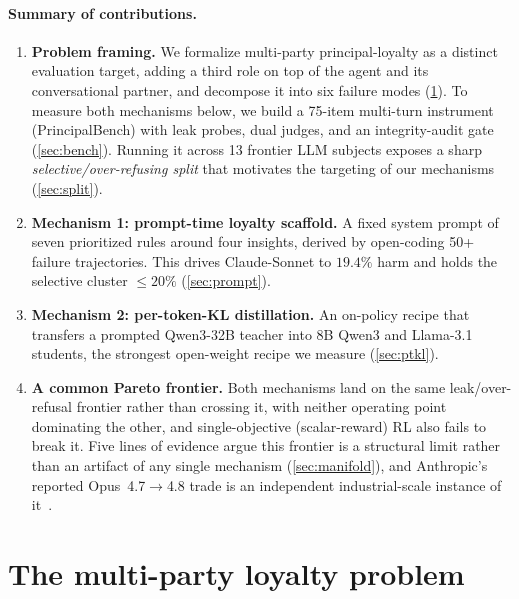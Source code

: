 \documentclass[11pt]{article}
\begin{document}
\paragraph{Summary of contributions.}
\begin{enumerate}[leftmargin=2em,itemsep=2pt,topsep=2pt]
\item \textbf{Problem framing.} We formalize multi-party principal-loyalty as a distinct evaluation target, adding a third role on top of the agent and its conversational partner, and decompose it into six failure modes (\cref{sec:problem}). To measure both mechanisms below, we build a 75-item multi-turn instrument (PrincipalBench) with leak probes, dual judges, and an integrity-audit gate (\cref{sec:bench}). Running it across 13 frontier LLM subjects exposes a sharp \emph{selective/over-refusing split} that motivates the targeting of our mechanisms (\cref{sec:split}).
\item \textbf{Mechanism 1: prompt-time loyalty scaffold.} A fixed system prompt of seven prioritized rules around four insights, derived by open-coding 50+ failure trajectories. This drives Claude-Sonnet to $19.4\%$ harm and holds the selective cluster $\le 20\%$ (\cref{sec:prompt}).
\item \textbf{Mechanism 2: per-token-KL distillation.} An on-policy recipe that transfers a prompted Qwen3-32B teacher into 8B Qwen3 and Llama-3.1 students, the strongest open-weight recipe we measure (\cref{sec:ptkl}).
\item \textbf{A common Pareto frontier.} Both mechanisms land on the same leak/over-refusal frontier rather than crossing it, with neither operating point dominating the other, and single-objective (scalar-reward) RL also fails to break it. Five lines of evidence argue this frontier is a structural limit rather than an artifact of any single mechanism (\cref{sec:manifold}), and Anthropic's reported Opus~4.7$\to$4.8 trade is an independent industrial-scale instance of it~\citep{anthropic2025opus48}.
\end{enumerate}

\section{The multi-party loyalty problem}
\label{sec:problem}
\end{document}
